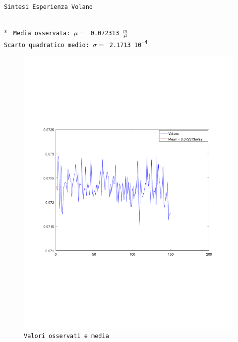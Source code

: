 \documentclass[10pt,a4paper]{report}
\begin{document}
\large
\begin{center}
	{\texttt{Sintesi Esperienza Volano}}
\end{center}
\normalsize
\mbox{}\\*
\texttt{
Media osservata: $\mu = $ 0.072313 $\frac{m}{s^2}$\\
Scarto quadratico medio: $\sigma = $ 2.1713 10\textsuperscript{-4}\\
}\begin{figure}
\centering
\includegraphics[width=\linewidth]{valuesPlot}
\caption{\texttt{Valori osservati e media}}
\label{fig:valuesplot}
\end{figure}
\end{document}

